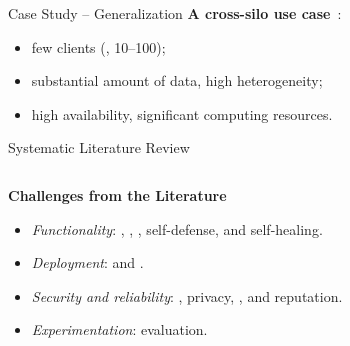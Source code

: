 \begin{frame}{Case Study -- Generalization}
  \textbf{A cross-silo use case}~\cite{kairouz_AdvancesOpenProblems_2021}:
  \begin{itemize}
    \item few clients (\ie, 10--100);
    \item substantial amount of data, high heterogeneity;
    \item high availability, significant computing resources.
  \end{itemize}
\end{frame}



\begin{frame}{Systematic Literature Review}
  
  \begin{columns}
    \begin{column}{.45\textwidth}

      \textbf{Challenges from the Literature}~\autocite{lavaur_tnsm_2022}
      \begin{itemize}[<+->]
        \item \emph{Functionality}: , , , self-defense, and self-healing.
        \item \emph{Deployment}:  and .
        \item \emph{Security and reliability}: , privacy, , and reputation.
        \item \emph{Experimentation}: evaluation.
      \end{itemize}
    \end{column}
    \begin{column}{.55\textwidth}
    \end{column}
  \end{columns}

\end{frame}


